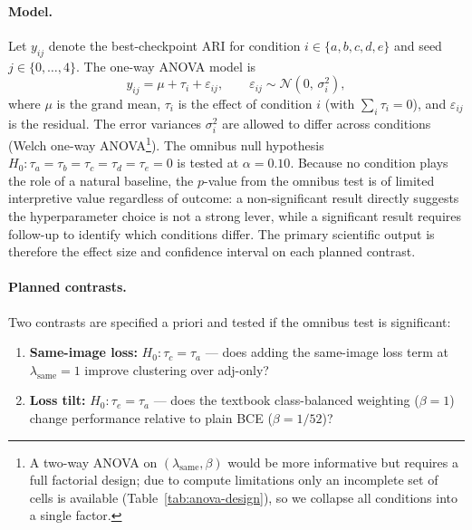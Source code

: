 \documentclass[12pt, a4paper]{article}
\begin{document}
\paragraph{Model.}
Let $y_{ij}$ denote the best-checkpoint ARI for condition
$i \in \{a,b,c,d,e\}$ and seed $j \in \{0,\dots,4\}$. The one-way ANOVA
model is
\begin{equation}
  y_{ij} = \mu + \tau_i + \varepsilon_{ij}, \qquad
  \varepsilon_{ij} \sim \mathcal{N}(0,\,\sigma_i^2),
  \label{eq:anova}
\end{equation}
where $\mu$ is the grand mean, $\tau_i$ is the effect of condition $i$
(with $\sum_i \tau_i = 0$), and $\varepsilon_{ij}$ is the residual. The
error variances $\sigma_i^2$ are allowed to differ across conditions
(Welch one-way ANOVA\footnote{A two-way ANOVA on $(\lambda_{\text{same}},
\beta)$ would be more informative but requires a full factorial design;
due to compute limitations only an incomplete set of cells is available
(Table~\ref{tab:anova-design}), so we collapse all conditions into a
single factor.}). The omnibus null hypothesis
$H_0\colon \tau_a = \tau_b = \tau_c = \tau_d = \tau_e = 0$ is tested at
$\alpha = 0.10$. Because no condition plays the role of a natural baseline,
the $p$-value from the omnibus test is of limited interpretive value
regardless of outcome: a non-significant result directly suggests the
hyperparameter choice is not a strong lever, while a significant result
requires follow-up to identify which conditions differ. The primary
scientific output is therefore the effect size and confidence interval on
each planned contrast.

\paragraph{Planned contrasts.}
Two contrasts are specified a priori and tested if the omnibus test is
significant:
\begin{enumerate}
  \item \textbf{Same-image loss:} $H_0\colon \tau_c = \tau_a$ — does adding
        the same-image loss term at $\lambda_{\text{same}}=1$ improve
        clustering over adj-only?
  \item \textbf{Loss tilt:} $H_0\colon \tau_e = \tau_a$ — does the textbook
        class-balanced weighting ($\beta=1$) change performance relative to
        plain BCE ($\beta=1/52$)?
\end{enumerate}
\end{document}
